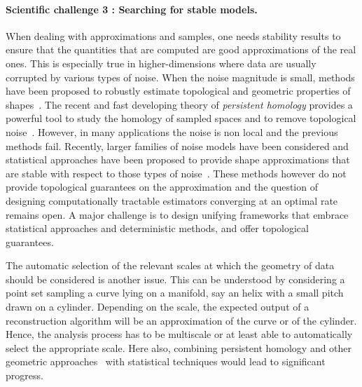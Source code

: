 \paragraph{Scientific challenge 3 : Searching for stable models.} 
When dealing with approximations and samples, one needs stability results to ensure that the quantities that are computed are good approximations of the real ones. This is especially true in higher-dimensions where data are usually corrupted by various types of noise.  When the noise magnitude is small, methods have been proposed to robustly estimate topological and geometric properties of shapes~\cite{nsw-tvu-2011}.  The recent and fast developing theory of {\em persistent homology} provides a powerful tool to study  the homology of sampled spaces and to remove topological noise~\cite{eh-ph-2008}.
However, in  many applications the noise is non local and the previous methods fail.
Recently,  larger families of noise models  have been considered and statistical approaches  have been proposed to provide shape approximations that are stable with respect to   those types of noise~\cite{gpvw-mme-2011}. These methods however do not provide topological guarantees on the approximation and the question of designing computationally tractable estimators converging at an optimal rate remains open. A major challenge is to design  unifying frameworks that embrace statistical approaches and deterministic methods, and offer topological guarantees.   

The automatic selection of the relevant scales at which the geometry of data should be considered is another issue.  This can be understood by considering a point set sampling a curve lying on a manifold, say an helix with a small pitch drawn on a cylinder. Depending on the scale, the expected output of a reconstruction algorithm will be an approximation of the curve or of the cylinder. Hence, the analysis process has to be multiscale or at least able to automatically select the appropriate scale.  Here also, combining persistent homology and other geometric approaches~\cite{geometrica-bgo-09} with statistical techniques would lead to significant progress.



